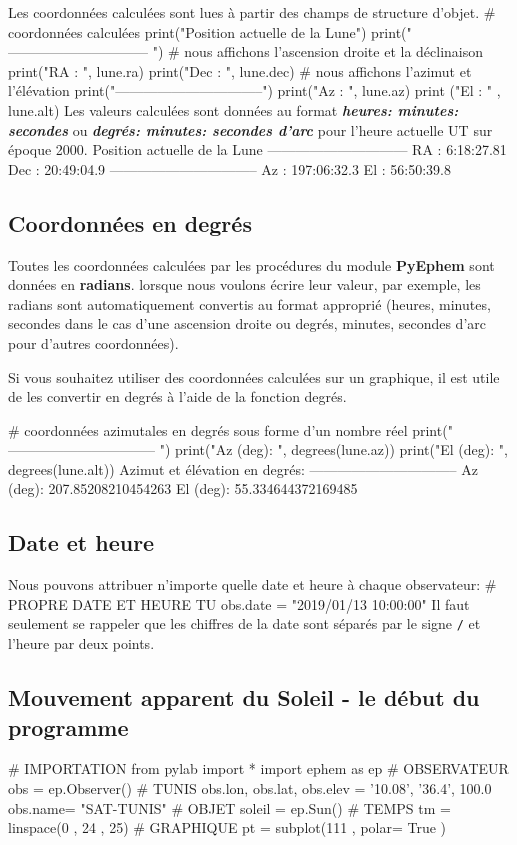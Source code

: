 \documentclass[%
oneside,                 %
final,                   %
10pt]{article}
\begin{document}
Les coordonnées calculées sont lues à partir des champs de structure d'objet.
\bpycod
# coordonnées calculées
print("Position actuelle de la Lune")
print(" ------------------------------ ")
# nous affichons l'ascension droite et la déclinaison
print("RA : ", lune.ra)
print("Dec : ", lune.dec)
# nous affichons l'azimut et l'élévation
print("--------------------------------")
print("Az : ", lune.az)
print ("El : " , lune.alt)
\epycod
Les valeurs calculées sont données au format \emph{\textbf{heures: minutes: secondes}} ou \emph{\textbf{degrés: minutes: secondes d'arc}} pour l'heure actuelle UT sur époque 2000.
\bccq
Position actuelle de la Lune
 ------------------------------
RA :  6:18:27.81
Dec :  20:49:04.9
--------------------------------
Az :  197:06:32.3
El :  56:50:39.8
\eccq
\subsection{Coordonnées en degrés}
Toutes les coordonnées calculées par les procédures du module \textbf{PyEphem} sont données en \textbf{radians}. lorsque nous voulons écrire leur valeur, par exemple, les radians sont automatiquement convertis au format approprié (heures, minutes, secondes dans le cas d'une ascension droite ou degrés, minutes, secondes d'arc pour d'autres coordonnées).

Si vous souhaitez utiliser des coordonnées calculées sur un graphique, il est utile de les convertir en degrés à l'aide de la fonction degrés.

\bpycod
# coordonnées azimutales en degrés sous forme d'un nombre réel
print(" -------------------------------- ")
print("Az (deg): ", degrees(lune.az))
print("El (deg): ", degrees(lune.alt))
\epycod
Azimut et élévation en degrés:
\bccq
--------------------------------
Az (deg):  207.85208210454263
El (deg):  55.334644372169485
\eccq

\subsection{Date et heure}

Nous pouvons attribuer n'importe quelle date et heure à chaque observateur:
\bpycod
# PROPRE DATE ET HEURE TU
obs.date = "2019/01/13 10:00:00"
\epycod
Il faut seulement se rappeler que les chiffres de la date sont séparés par le signe \texttt{/} et l'heure par deux points.

\subsection{Mouvement apparent du Soleil - le début du programme}
\bpycod
# IMPORTATION
from pylab import *
import ephem as ep
# OBSERVATEUR
obs = ep.Observer()
# TUNIS
obs.lon, obs.lat, obs.elev = '10.08', '36.4', 100.0
obs.name= "SAT-TUNIS"
# OBJET
soleil = ep.Sun()
# TEMPS
tm = linspace(0 , 24 , 25)
# GRAPHIQUE
pt = subplot(111 , polar= True )
\epycod
\end{document}
